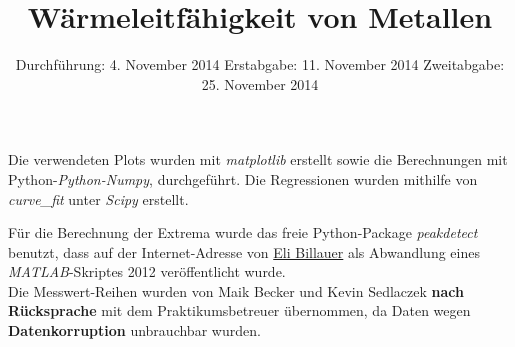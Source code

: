 
\usepackage{longtable}

\subject{Anfängerpraktikum V204}
\title{Wärmeleitfähigkeit von Metallen}

\date{
  Durchführung: 4. November 2014
  \hspace{0.5em}
  Erstabgabe: 11. November 2014
  \vspace{0.5em}
  Zweitabgabe: 25. November 2014
}


\maketitle
\thispagestyle{empty}
\newpage
\nocite{Helena}




%
%
%


\printbibliography
\noindent Die verwendeten Plots wurden mit \textit{matplotlib}\cite{matplotlib} erstellt sowie die Berechnungen mit Python-\textit{Python-Numpy}, \cite{numpy} durchgeführt.
Die Regressionen wurden mithilfe von \textit{curve\_fit} unter \textit{Scipy}\cite{scipy} erstellt.

Für die Berechnung der Extrema wurde das freie Python-Package \textit{peakdetect} benutzt, dass auf der Internet-Adresse von \href{http://billauer.co.il/peakdet.html}{Eli Billauer} als Abwandlung eines \textit{MATLAB}-Skriptes 2012 veröffentlicht wurde.\\

\noindent Die Messwert-Reihen wurden von Maik Becker und Kevin Sedlaczek \textbf{nach Rücksprache} mit dem Praktikumsbetreuer übernommen, da Daten wegen \textbf{Datenkorruption} unbrauchbar wurden.




